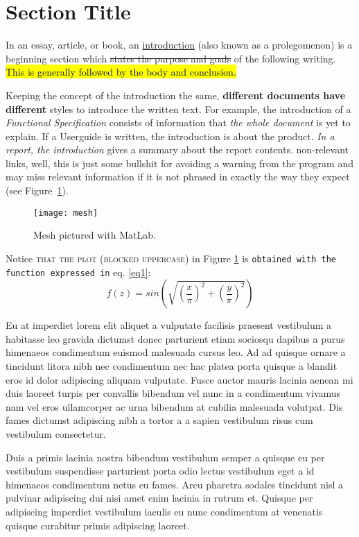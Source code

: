 \section{Section Title}
In an essay, article, or book, an \ul{introduction} (also known as a prolegomenon) is a beginning section which \st{states the purpose and goals} of the following writing. \hl{This is generally followed by the body and conclusion.}

Keeping the concept of the introduction the same, \textbf{different documents have different} styles to introduce the written text. For example, the introduction of a \textit{Functional Specification} consists of information that \textit{the whole document} is yet to explain. If a Userguide is written, the introduction is about the product. \textsl{In a report, the introduction} gives a summary about the report contents. \cite{kimura1982current} non-relevant links, well, this is just some bullshit for avoiding a warning from the program and may miss relevant information \textsf{if it is not phrased} in exactly the way they expect (see Figure~\ref{fig:mesh}).
\begin{figure}[h]
    \centering
    \texttt{[image: mesh]}
    \caption{Mesh pictured with MatLab.}
    \label{fig:mesh}
\end{figure}

Notice \textsc{that the plot (blocked uppercase)} in Figure \ref{fig:mesh} is \texttt{obtained with the function expressed in} eq. \ref{eq1}:
\begin{equation}\label{eq1}
f(z)=sin\left(\sqrt{\left(\frac{x}{\pi}\right)^2+\left(\frac{y}{\pi}\right)^2}\right)
\end{equation}

Eu at imperdiet lorem elit aliquet a vulputate facilisis praesent vestibulum a habitasse leo gravida dictumst donec parturient etiam sociosqu dapibus a purus himenaeos condimentum euismod malesuada cursus leo. Ad ad quisque ornare a tincidunt litora nibh nec condimentum nec hac platea porta quisque a blandit eros id dolor adipiscing aliquam vulputate. Fusce auctor mauris lacinia aenean mi duis laoreet turpis per convallis bibendum vel nunc in a condimentum vivamus nam vel eros ullamcorper ac urna bibendum at cubilia malesuada volutpat. Dis fames dictumst adipiscing nibh a tortor a a sapien vestibulum risus cum vestibulum consectetur.

Duis a primis lacinia nostra bibendum vestibulum semper a quisque eu per vestibulum suspendisse parturient porta odio lectus vestibulum eget a id himenaeos condimentum netus eu fames. Arcu pharetra sodales tincidunt nisl a pulvinar adipiscing dui nisi amet enim lacinia in rutrum et. Quisque per adipiscing imperdiet vestibulum iaculis eu nunc condimentum at venenatis quisque curabitur primis adipiscing laoreet.


